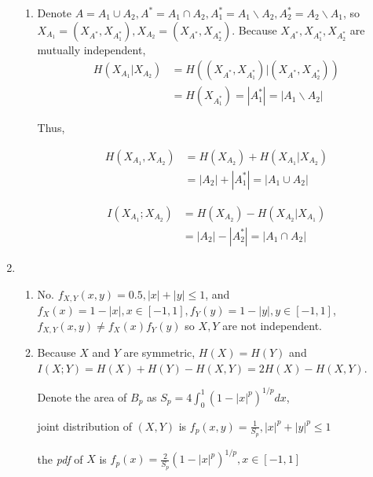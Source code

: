 \documentclass[a4paper]{article}
\begin{document}
\begin{enumerate}
\begin{enumerate}
      \item Denote $A = A_1 \cup A_2 , A^* = A_1 \cap A_2 ,A_1^* = A_1 \backslash A_2, A_2^* = A_2 \backslash A_1$, so $X_{A_1} = (X_{A^*},X_{A_1^*}),X_{A_2} = (X_{A^*},X_{A_2^*}) $. Because  $X_{A^*},X_{A_1^*},X_{A_2^*}$ are mutually independent,
      \begin{equation}
        \begin{aligned}
          H(X_{A_1}|X_{A_2}) & = H((X_{A^*},X_{A_1^*})|(X_{A^*},X_{A_2^*}) ) \\
          & = H(X_{A_1^*}) = |A_1^*| = |A_1 \backslash A_2|
        \end{aligned}
      \end{equation}

      Thus,

      \begin{equation}
        \begin{aligned}
          H(X_{A_1},X_{A_2}) & = H(X_{A_2}) + H(X_{A_1}|X_{A_2})  \\
          & =  |A_2| + |A_1^*| = |A_1 \cup A_2|
        \end{aligned}
      \end{equation}

      \begin{equation}
        \begin{aligned}
          I(X_{A_1};X_{A_2}) & = H(X_{A_2}) - H(X_{A_2}|X_{A_1})  \\
          & =  |A_2| - |A_2^*| = |A_1 \cap A_2|
        \end{aligned}
      \end{equation}

    \end{enumerate}


    \item 
    \begin{enumerate}
    \item No. $f_{X,Y}(x,y) = 0.5,|x|+|y|\leqslant 1$, and $f_X(x) = 1-|x|,x\in [-1,1],f_Y(y) = 1-|y|,y\in [-1,1]$, $f_{X,Y}(x,y) \neq f_X(x)f_Y(y)$ so $X,Y$ are not independent. 
    \item  Because $X$ and $Y$ are symmetric, $H(X)=H(Y)$ and $I(X;Y) = H(X)+H(Y)-H(X,Y) = 2H(X)-H(X,Y)$. 
    
    Denote the area of $B_p$ as $S_p = 4\int_{0}^{1} (1-|x|^p)^{1/p} dx $, 
    
    joint distribution of $(X,Y)$ is $f_p(x,y)= \frac{1}{S_p},|x|^{p}+|y|^{p} \leqslant 1$ 
    
    the \textit{pdf} of $X$ is $f_p(x) = \frac 2 {S_p} (1-|x|^p)^{1/p},x \in [-1,1]$


\end{enumerate}
\end{enumerate}
\end{document}
